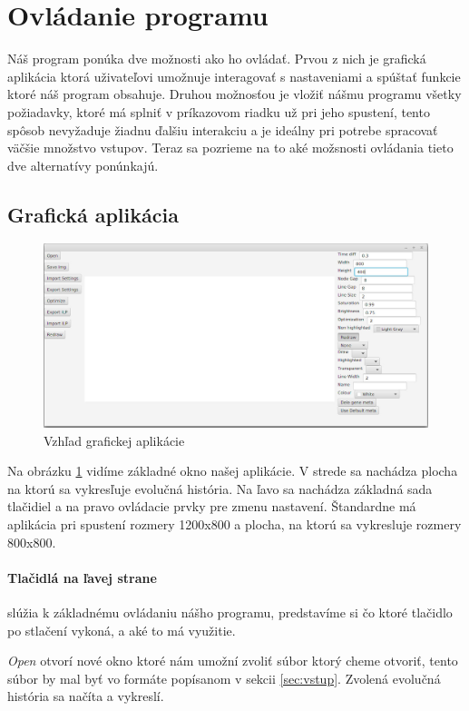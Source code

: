 \section{Ovládanie programu}
Náš program ponúka dve možnosti ako ho ovládať. Prvou z nich je grafická aplikácia ktorá uživateľovi umožnuje interagovať s nastaveniami a spúštať funkcie ktoré náš program obsahuje.
Druhou možnosťou je vložiť nášmu programu všetky požiadavky, ktoré má splniť v príkazovom riadku už pri jeho spustení, tento spôsob nevyžaduje žiadnu ďalšiu interakciu a je ideálny pri potrebe spracovať väčšie množstvo vstupov.
Teraz sa pozrieme na to aké možsnosti ovládania tieto dve alternatívy ponúnkajú.
\subsection{Grafická aplikácia}
\begin{figure}[t]
 \centering
\includegraphics[width=1\textwidth]{images/gui}
\caption{Vzhľad grafickej aplikácie}\label{obr:gui}
\end{figure}

Na obrázku \ref{obr:gui} vidíme základné okno našej aplikácie. V strede sa nachádza plocha na ktorú sa vykresľuje evolučná história. Na ľavo sa nachádza základná sada tlačidiel a na pravo ovládacie prvky pre zmenu nastavení.
Štandardne má aplikácia pri spustení rozmery 1200x800 a plocha, na ktorú sa vykresluje rozmery 800x800.
\paragraph{Tlačidlá na ľavej strane} slúžia k základnému ovládaniu nášho programu, predstavíme si čo ktoré tlačidlo po stlačení vykoná, a aké to má využitie.

\emph{Open} otvorí nové okno ktoré nám umožní zvoliť súbor ktorý cheme otvoriť, tento súbor by mal byť vo formáte popísanom v sekcii \ref{sec:vstup}. 
 Zvolená evolučná história sa načíta a vykreslí.
 
